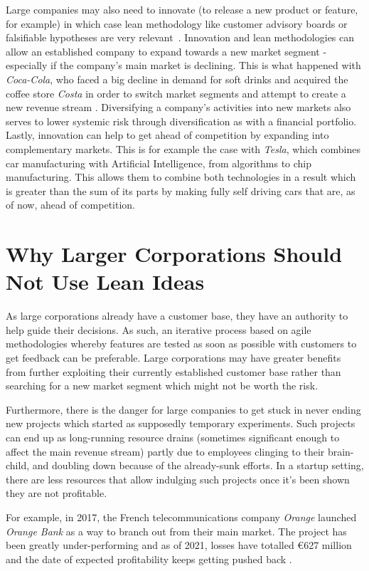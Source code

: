 \documentclass[conference]{IEEEtran}
\begin{document}
    Large companies may also need to innovate (to release a new product or feature, for example) in which
    case lean methodology like customer advisory boards or falsifiable hypotheses are very
    relevant~\cite{theLeanStartupBlog}.
    Innovation and lean methodologies can allow an established company to expand towards a new market segment - especially if the company's main market is declining. This is what happened with \textit{Coca-Cola}, who faced a big decline in demand for soft drinks and acquired the coffee store \textit{Costa} in order to switch market segments and attempt to create a new revenue stream \cite{coke}.
    Diversifying a company's activities into new markets also serves to lower systemic risk through diversification as with a financial portfolio. Lastly, innovation can help to get ahead of competition by expanding into complementary markets. This is for example the case with \textit{Tesla}, which combines car manufacturing with Artificial Intelligence, from algorithms to chip manufacturing. This allows them to combine both technologies in a result which is greater than the sum of its parts by making fully self driving cars that are, as of now, ahead of competition.


    \section{Why Larger Corporations Should Not Use Lean Ideas}

    As large corporations already have a customer base, they have an authority to help guide their decisions. As such, an iterative process based on agile methodologies whereby features are tested as soon as possible with customers to get feedback can be preferable. Large corporations may have greater benefits from further exploiting their currently established customer base rather than searching for a new market segment which might not be worth the risk.

    Furthermore, there is the danger for large companies to get stuck in never ending new projects which started as supposedly temporary experiments.
    Such projects can end up as long-running resource drains (sometimes significant enough to affect the main revenue stream) partly due to employees clinging to their brain-child, and doubling down because of the already-sunk efforts.
    In a startup setting, there are less resources that allow indulging such projects once it's been shown they are not profitable.

    For example, in 2017, the French telecommunications company \textit{Orange} launched \textit{Orange Bank} as a way to branch out from their main market. The project has been greatly under-performing and as of 2021, losses have totalled €627 million and the date of expected profitability keeps getting pushed back \cite{orange}.
\end{document}
